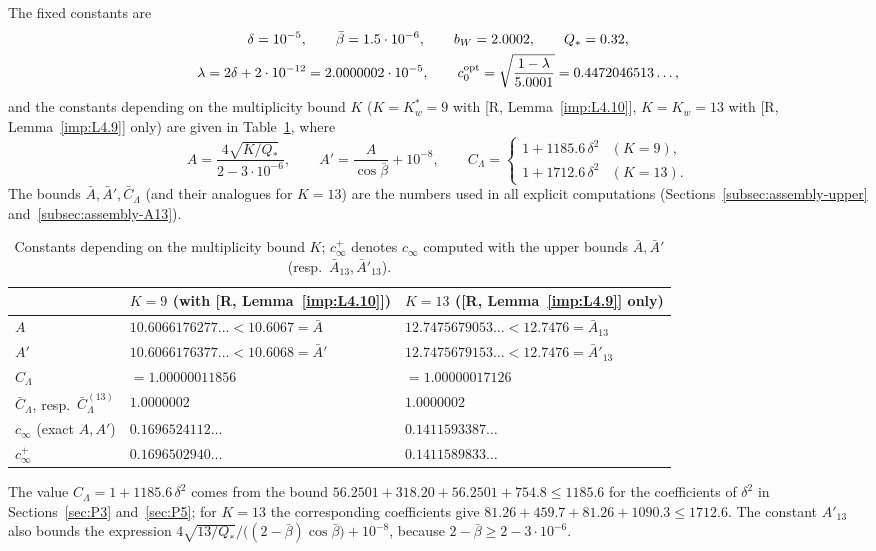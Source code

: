 \documentclass[11pt]{amsart}
\newcommand{\bbar}{\bar\beta}
\newcommand{\Lam}{\Lambda}
\theoremstyle{definition}
\theoremstyle{remark}
\numberwithin{equation}{section}
\begin{document}
The fixed constants are
\begin{gather*}
\delta=10^{-5},\qquad \bbar=1.5\cdot10^{-6},\qquad b_W=2.0002,\qquad Q_*=0.32,\\
\lambda=2\delta+2\cdot10^{-12}=2.0000002\cdot10^{-5},\qquad
c_0^{\rm opt}=\sqrt{\frac{1-\lambda}{5.0001}}=0.4472046513\ldots,
\end{gather*}
and the constants depending on the multiplicity bound $K$ ($K=K_w^*=9$ with [R, Lemma~\ref{imp:L4.10}], $K=K_w=13$ with
[R, Lemma~\ref{imp:L4.9}] only) are given in Table~\ref{tab:const-fixed}, where
\[
A=\frac{4\sqrt{K/Q_*}}{2-3\cdot10^{-6}},\qquad A'=\frac{A}{\cos\bbar}+10^{-8},\qquad
C_\Lam=\begin{cases}1+1185.6\,\delta^2&(K=9),\\ 1+1712.6\,\delta^2&(K=13).\end{cases}
\]
The bounds $\bar A,\bar A',\bar C_\Lam$ (and their analogues for $K=13$) are the numbers used in all explicit
computations (Sections~\ref{subsec:assembly-upper} and~\ref{subsec:assembly-A13}).

\begin{table}[ht]
\centering
\caption{Constants depending on the multiplicity bound $K$; $c_\infty^+$ denotes $c_\infty$ computed with the upper
bounds $\bar A,\bar A'$ (resp.\ $\bar A_{13},\bar A'_{13}$).}\label{tab:const-fixed}
\small
\begin{tabular}{|l|l|l|}
\hline
 & $K=9$ (with [R, Lemma~\ref{imp:L4.10}]) & $K=13$ ([R, Lemma~\ref{imp:L4.9}] only)\\
\hline
$A$ & $10.6066176277\ldots<10.6067=\bar A$ & $12.7475679053\ldots<12.7476=\bar A_{13}$\\
$A'$ & $10.6066176377\ldots<10.6068=\bar A'$ & $12.7475679153\ldots<12.7476=\bar A'_{13}$\\
$C_\Lam$ & $=1.00000011856$ & $=1.00000017126$\\
$\bar C_\Lam$, resp.\ $\bar C^{(13)}_\Lam$ & $1.0000002$ & $1.0000002$\\
$c_\infty$ (exact $A,A'$) & $0.1696524112\ldots$ & $0.1411593387\ldots$\\
$c_\infty^+$ & $0.1696502940\ldots$ & $0.1411589833\ldots$\\
\hline
\end{tabular}
\end{table}

The value $C_\Lam=1+1185.6\,\delta^2$ comes from the bound
$56.2501+318.20+56.2501+754.8\le1185.6$ for the coefficients of $\delta^2$ in Sections~\ref{sec:P3}
and~\ref{sec:P5}; for $K=13$ the corresponding coefficients give $81.26+459.7+81.26+1090.3\le1712.6$. The constant
$A'_{13}$ also bounds the expression $4\sqrt{13/Q_*}/\big((2-\bbar)\cos\bbar\big)+10^{-8}$, because
$2-\bbar\ge2-3\cdot10^{-6}$.
\end{document}
